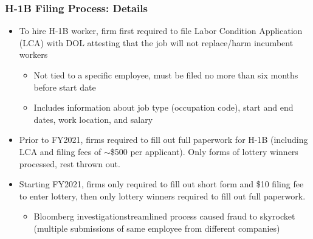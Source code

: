 \documentclass[xcolor=dvipsnames, compress, 12pt, aspectratio=169, handout]{beamer}
\begin{document}
\begin{frame}\label{h1bfiling}
    \frametitle{H-1B Filing Process: Details}
        \begin{itemize}
            \item To hire H-1B worker, firm first required to file Labor Condition Application (LCA) with DOL attesting that the job will not replace/harm incumbent workers
            \begin{itemize}
                \item Not tied to a specific employee, must be filed no more than six months before start date
                \item Includes information about job type (occupation code), start and end dates, work location, and salary
            \end{itemize}
            \item Prior to FY2021, firms required to fill out full paperwork for H-1B (including LCA and filing fees of $\sim$\$500 per applicant). Only forms of lottery winners processed, rest thrown out. 
            \item Starting FY2021, firms only required to fill out short form and \$10 filing fee to enter lottery, then only lottery winners required to fill out full paperwork. 
            \begin{itemize}
                \item Bloomberg investigation\textemdash streamlined process caused fraud to skyrocket (multiple submissions of same employee from different companies)
            \end{itemize}
        \end{itemize}
\end{frame}
\end{document}
